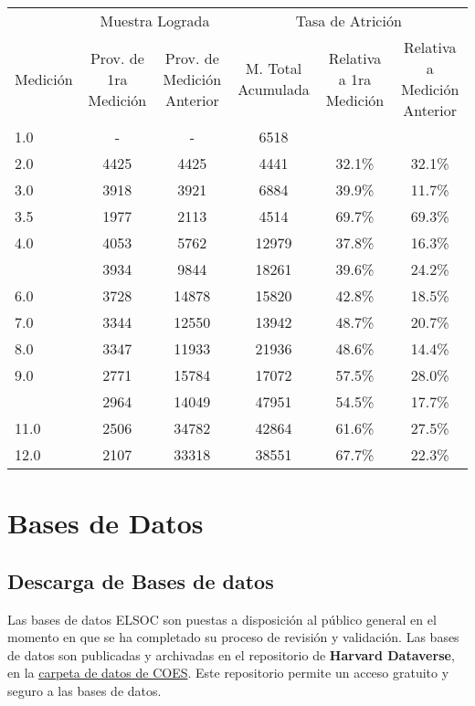 \documentclass[
  12pt,
]{article}
\begin{document}
\begin{table}[H]
\centering
\begin{tabular}[t]{lccccc}
\toprule
\multicolumn{1}{c}{ } & \multicolumn{2}{c}{Muestra Lograda} & \multicolumn{3}{c}{Tasa de Atrición} \\
\cmidrule(l{3pt}r{3pt}){2-3} \cmidrule(l{3pt}r{3pt}){4-6}
Medición & Prov. de 1ra Medición & Prov. de Medición Anterior & M. Total Acumulada & Relativa a 1ra Medición & Relativa a Medición Anterior\\
\midrule
1.0 & - & - & 6518 &  & \\
2.0 & 4425 & 4425 & 4441 & 32.1\% & 32.1\%\\
3.0 & 3918 & 3921 & 6884 & 39.9\% & 11.7\%\\
3.5 & 1977 & 2113 & 4514 & 69.7\% & 69.3\%\\
4.0 & 4053 & 5762 & 12979 & 37.8\% & 16.3\%\\
\addlinespace
5.0 & 3934 & 9844 & 18261 & 39.6\% & 24.2\%\\
6.0 & 3728 & 14878 & 15820 & 42.8\% & 18.5\%\\
7.0 & 3344 & 12550 & 13942 & 48.7\% & 20.7\%\\
8.0 & 3347 & 11933 & 21936 & 48.6\% & 14.4\%\\
9.0 & 2771 & 15784 & 17072 & 57.5\% & 28.0\%\\
\addlinespace
10.0 & 2964 & 14049 & 47951 & 54.5\% & 17.7\%\\
11.0 & 2506 & 34782 & 42864 & 61.6\% & 27.5\%\\
12.0 & 2107 & 33318 & 38551 & 67.7\% & 22.3\%\\
\bottomrule
\end{tabular}
\end{table}

\newpage

\hypertarget{bases-datos}{%
\section{Bases de Datos}\label{bases-datos}}

\hypertarget{descarga-de-bases-de-datos}{%
\subsection{Descarga de Bases de datos}\label{descarga-de-bases-de-datos}}

Las bases de datos ELSOC son puestas a disposición al público general en el momento en que se ha completado su proceso de revisión y validación. Las bases de datos son publicadas y archivadas en el repositorio de \textbf{Harvard Dataverse}, en la \href{https://dataverse.harvard.edu/dataverse/coes_data_repository}{carpeta de datos de COES}. Este repositorio permite un acceso gratuito y seguro a las bases de datos.
\end{document}
